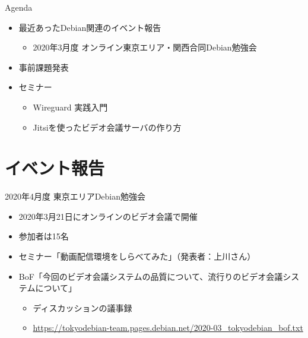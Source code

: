 \begin{frame}{Agenda}
 \begin{minipage}[t]{0.45\hsize}
  \begin{itemize}
  \item 最近あったDebian関連のイベント報告
    \begin{itemize}
    \item 2020年3月度 オンライン東京エリア・関西合同Debian勉強会
    \end{itemize}
  \item 事前課題発表
  \end{itemize}
 \end{minipage}
 \begin{minipage}[t]{0.45\hsize}
   \begin{itemize}
   \item セミナー
     \begin{itemize}
     \item Wireguard 実践入門
     \item Jitsiを使ったビデオ会議サーバの作り方
     \end{itemize}
  \end{itemize}
 \end{minipage}
\end{frame}

\section{イベント報告}

\begin{frame}{2020年4月度 東京エリアDebian勉強会}
\begin{itemize}
\item 2020年3月21日にオンラインのビデオ会議で開催
\item 参加者は15名
\item セミナー「動画配信環境をしらべてみた」（発表者：上川さん）
\item BoF「今回のビデオ会議システムの品質について、流行りのビデオ会議システムについて」
  \begin{itemize}
    \item ディスカッションの議事録
    \item \url{https://tokyodebian-team.pages.debian.net/2020-03_tokyodebian_bof.txt}
  \end{itemize}
\end{itemize}
\end{frame}


